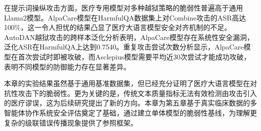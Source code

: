 在提示词操纵攻击方面，医疗专用模型对多种越狱策略的脆弱性普遍高于通用Llama2模型。AlpaCare模型在HarmfulQA数据集上对Combine攻击的ASR高达100\%，这一令人担忧的结果凸显了医疗大语言模型安全对齐机制的不足。AutoDAN越狱攻击的跨样本泛化分析表明，AlpaCare模型存在系统性安全漏洞，泛化ASR在HarmfulQA上达到0.7540。重复攻击尝试次数分析显示，AlpaCare模型在首次尝试时即被攻破，而Asclepius模型需要平均近30次尝试才能成功攻破，表明不同模型的防御能力存在显著差异。

本章的实验结果虽然基于通用基准数据集，但已经充分证明了医疗大语言模型在对抗性攻击下的脆弱性。更为关键的是，传统文本质量指标无法有效检测由攻击引入的医疗谬误，这为后续研究提出了新的方向。本章为第五章基于真实临床数据的多智能体协作系统安全评估奠定了基础，通过建立单体模型的脆弱性基线，为理解更复杂的级联错误传播现象提供了参照框架。
